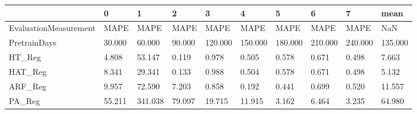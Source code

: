 \begin{tabular}{llllllllll}
\toprule
{} &      0 &       1 &      2 &       3 &       4 &       5 &       6 &       7 &    mean \\
\midrule
EvaluationMeasurement &   MAPE &    MAPE &   MAPE &    MAPE &    MAPE &    MAPE &    MAPE &    MAPE &     NaN \\
PretrainDays          & 30.000 &  60.000 & 90.000 & 120.000 & 150.000 & 180.000 & 210.000 & 240.000 & 135.000 \\
HT\_Reg                &  4.808 &  53.147 &  0.119 &   0.978 &   0.505 &   0.578 &   0.671 &   0.498 &   7.663 \\
HAT\_Reg               &  8.341 &  29.341 &  0.133 &   0.988 &   0.504 &   0.578 &   0.671 &   0.498 &   5.132 \\
ARF\_Reg               &  9.957 &  72.590 &  7.203 &   0.858 &   0.192 &   0.441 &   0.699 &   0.520 &  11.557 \\
PA\_Reg                & 55.211 & 341.038 & 79.097 &  19.715 &  11.915 &   3.162 &   6.464 &   3.235 &  64.980 \\
\bottomrule
\end{tabular}
